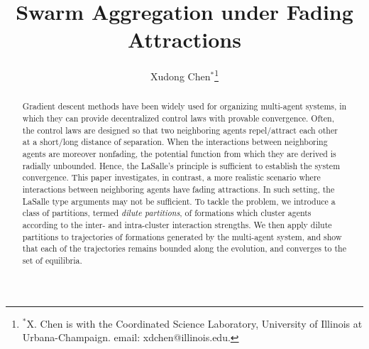 \documentclass[10pt,twocolumn,twoside]{IEEEtran}
\title{\LARGE \bf
Swarm Aggregation under Fading Attractions}
\author{Xudong Chen$^*$\thanks{$^*$X. Chen is with the Coordinated Science Laboratory, University of Illinois at Urbana-Champaign. email: xdchen@illinois.edu.}}
\renewcommand{\(}{\left (}
\renewcommand{\)}{\right )}
\renewcommand{\;}{\,;\,}
\begin{document}
\maketitle
\thispagestyle{empty}
\pagestyle{empty}

\begin{abstract}
Gradient descent methods have been widely used for organizing multi-agent systems, in which they can provide decentralized control laws with provable convergence. 
Often, the control laws are designed so that two neighboring agents repel/attract each other at a short/long distance of separation. 
When the interactions between neighboring agents are moreover nonfading, the potential function from which they are derived is radially unbounded. Hence, the LaSalle's principle is sufficient to establish the system convergence. 
This paper investigates, in contrast, a more realistic scenario where interactions between neighboring agents have fading attractions. In such setting, the LaSalle type arguments may not be sufficient. To tackle the problem,  
we introduce a class of partitions, termed \emph {dilute partitions}, of formations which cluster agents according to the inter- and intra-cluster interaction strengths.  We then apply dilute partitions to trajectories of formations  generated by the multi-agent system, and show that each of the trajectories remains bounded along the evolution,  and converges to the set of equilibria.    
\end{abstract}
\end{document}
